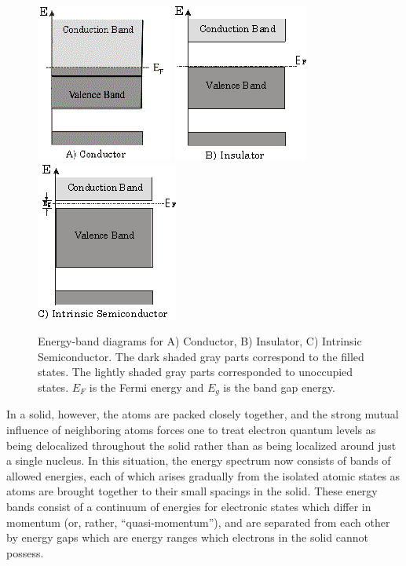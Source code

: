 \documentclass{../lab}
\begin{document}
\begin{figure}[h]
    \centering
    \href{http://experimentationlab.berkeley.edu/sites/default/files/images/SHEimage016.gif}{\includegraphics[width=0.25\linewidth,keepaspectratio]{images/SHEimage016.png}}
    \href{http://experimentationlab.berkeley.edu/sites/default/files/images/SHEimage017.gif}{\includegraphics[width=0.25\linewidth,keepaspectratio]{images/SHEimage017.png}}
    \href{http://experimentationlab.berkeley.edu/sites/default/files/images/SHEimage018.gif}{\includegraphics[width=0.25\linewidth,keepaspectratio]{images/SHEimage018.png}}
    \caption{Energy-band diagrams for A) Conductor, B) Insulator, C) Intrinsic Semiconductor. The dark shaded gray parts correspond to the filled states. The lightly shaded gray parts corresponded to unoccupied states. $E_{F}$ is the Fermi energy and $E_{g}$ is the band gap energy.}
    \label{fig:EnergyBandDiagrams}
\end{figure}

In a solid, however, the atoms are packed closely together, and the strong mutual influence of neighboring atoms forces one to treat electron quantum levels as being delocalized throughout the solid rather than as being localized around just a single nucleus. In this situation, the energy spectrum now consists of bands of allowed energies, each of which arises gradually from the isolated atomic states as atoms are brought together to their small spacings in the solid. These energy bands consist of a continuum of energies for electronic states which differ in momentum (or, rather, ``quasi-momentum''), and are separated from each other by energy gaps which are energy ranges which electrons in the solid cannot possess.
\end{document}
